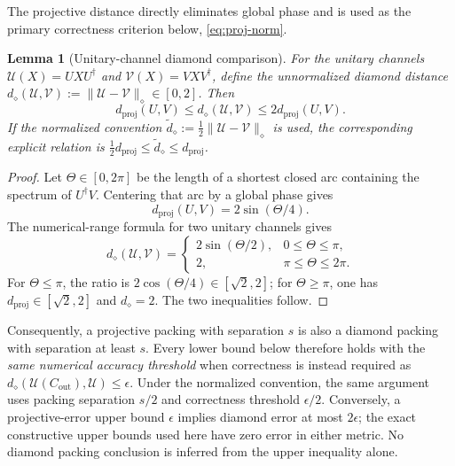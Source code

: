 \documentclass[aps,prx,reprint,floatfix,superscriptaddress]{revtex4-2}
\newtheorem{lemma}{Lemma}
\begin{document}
The projective distance directly eliminates global phase and is used as
the primary correctness criterion below, \eqref{eq:proj-norm}.

\begin{lemma}[Unitary-channel diamond comparison]
\label{lem:diamond-comparison}
For the unitary channels
$\mathcal U(X)=UXU^\dagger$ and $\mathcal V(X)=VXV^\dagger$, define the
\emph{unnormalized} diamond distance
$d_\diamond(\mathcal U,\mathcal V)
:=\|\mathcal U-\mathcal V\|_\diamond\in[0,2]$.  Then
\begin{equation*}
 d_{\mathrm{proj}}(U,V)
 \leq d_\diamond(\mathcal U,\mathcal V)
 \leq 2d_{\mathrm{proj}}(U,V).
\end{equation*}
If the normalized convention
$\widetilde d_\diamond:=\tfrac12\|\mathcal U-\mathcal V\|_\diamond$ is used,
the corresponding explicit relation is
$\tfrac12d_{\mathrm{proj}}\leq\widetilde d_\diamond\leq
d_{\mathrm{proj}}$.
\end{lemma}

\begin{proof}
Let $\Theta\in[0,2\pi]$ be the length of a shortest closed arc containing
the spectrum of $U^\dagger V$.  Centering that arc by a global phase gives
\begin{equation*}
 d_{\mathrm{proj}}(U,V)=2\sin(\Theta/4).
\end{equation*}
The numerical-range formula for two unitary channels gives
\begin{equation*}
 d_\diamond(\mathcal U,\mathcal V)=
 \begin{cases}
  2\sin(\Theta/2),&0\leq\Theta\leq\pi,\\
  2,&\pi\leq\Theta\leq2\pi.
 \end{cases}
\end{equation*}
For $\Theta\leq\pi$, the ratio is $2\cos(\Theta/4)\in[\sqrt2,2]$;
for $\Theta\geq\pi$, one has
$d_{\mathrm{proj}}\in[\sqrt2,2]$ and $d_\diamond=2$.  The two inequalities
follow.
\end{proof}

Consequently, a projective packing with separation $s$ is also a diamond
packing with separation at least $s$.  Every lower bound below therefore
holds with the \emph{same numerical accuracy threshold} when correctness is
instead required as
$d_\diamond(\mathcal U(C_{\mathrm{out}}),\mathcal U)\leq\epsilon$.
Under the normalized convention, the same argument uses packing separation
$s/2$ and correctness threshold $\epsilon/2$.
Conversely, a projective-error upper bound $\epsilon$ implies diamond error
at most $2\epsilon$; the exact constructive upper bounds used here have zero
error in either metric.  No diamond packing conclusion is inferred from the
upper inequality alone.
\end{document}
